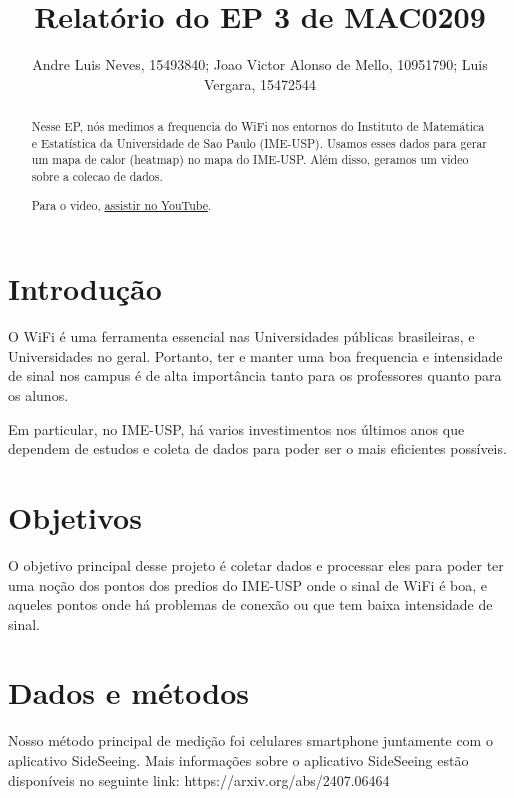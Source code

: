 \documentclass{article}
\title{Relatório do EP 3 de MAC0209}
\author{Andre Luis Neves, 15493840; Joao Victor Alonso de Mello, 10951790; Luis Vergara, 15472544}
\begin{document}
\maketitle


\begin{abstract}
  Nesse EP, nós medimos a frequencia do WiFi nos entornos do Instituto de Matemática e Estatística
  da Universidade de Sao Paulo (IME-USP). Usamos esses dados para gerar um mapa de calor (heatmap)
  no mapa do IME-USP. Além disso, geramos um video sobre a colecao de dados. 

Para o video, \href{https://youtube.com}{assistir no YouTube}.

\end{abstract}

\newpage

\tableofcontents

\newpage

\section{Introdução}
O WiFi é uma ferramenta essencial nas Universidades públicas brasileiras, e Universidades no geral.
Portanto, ter e manter uma boa frequencia e intensidade de sinal nos campus é de alta importância
tanto para os professores quanto para os alunos.  

Em particular, no IME-USP, há varios investimentos nos últimos anos que dependem de estudos e coleta
de dados para poder ser o mais eficientes possíveis. 

\section{Objetivos}
O objetivo principal desse projeto é coletar dados e processar eles para poder ter uma noção dos
pontos dos predios do IME-USP onde o sinal de WiFi é boa, e aqueles pontos onde há problemas de
conexão ou que tem baixa intensidade de sinal.  



\section{Dados e métodos}
Nosso método principal de medição foi celulares smartphone juntamente com o aplicativo SideSeeing.
Mais informações sobre o aplicativo SideSeeing estão disponíveis no seguinte link:
https://arxiv.org/abs/2407.06464
\end{document}

